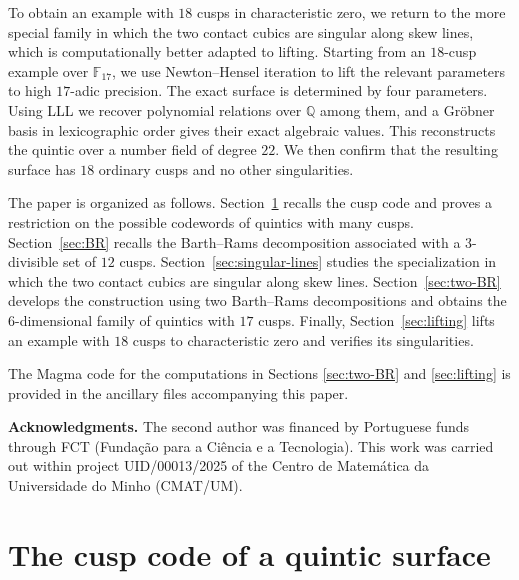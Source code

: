 \documentclass[10pt,a4paper]{article}
\begin{document}
To obtain an example with $18$ cusps in characteristic zero, we return to the
more special family in which the two contact cubics are singular along skew
lines, which is computationally better adapted to lifting.  Starting from an
$18$-cusp example over $\mathbb F_{17}$, we use Newton--Hensel iteration to
lift the relevant parameters to high $17$-adic precision.  The exact surface
is determined by four parameters. Using LLL we recover polynomial
relations over $\mathbb Q$ among them, and a Gr\"obner basis in lexicographic
order gives their exact algebraic values.  This reconstructs the quintic over
a number field of degree $22$.  We then confirm that the resulting 
surface has $18$ ordinary cusps and no other singularities.

The paper is organized as follows.  Section~\ref{sec:cusp-code} recalls the
cusp code and proves a restriction on the possible codewords of quintics with
many cusps.  Section~\ref{sec:BR} recalls the Barth--Rams decomposition
associated with a $3$-divisible set of $12$ cusps.  Section~\ref{sec:singular-lines}
studies the specialization in which the two contact cubics are singular along
skew lines.  Section~\ref{sec:two-BR} develops the construction using two
Barth--Rams decompositions and obtains the $6$-dimensional family of quintics
with $17$ cusps.  Finally, Section~\ref{sec:lifting} lifts an example with $18$
cusps to characteristic zero and verifies its singularities.

The Magma code for the computations in Sections \ref{sec:two-BR} and \ref{sec:lifting}
is provided in the ancillary files accompanying this paper.



\bigskip
\noindent\textbf{Acknowledgments.}
The second author was financed by Portuguese funds through FCT
(Funda\c c\~ao para a Ci\^encia e a Tecnologia).  This work was carried out
within project UID/00013/2025 of the Centro de Matem\'atica da Universidade
do Minho (CMAT/UM).


\section{The cusp code of a quintic surface}
\label{sec:cusp-code}
\end{document}
